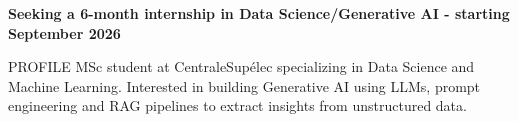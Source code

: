 \documentclass{resume}
\begin{document}
\vspace*{-0.5em}

\vspace*{-0.5em}
\begin{center}
    \noindent\textbf{Seeking a 6-month internship in Data Science/Generative AI - starting September 2026}
\end{center}
\vspace*{-0.5em}
\begin{rSection}{PROFILE}\vspace{-0.3em}
MSc student at CentraleSupélec specializing in Data Science and Machine Learning. Interested in building Generative AI using LLMs, prompt engineering and RAG pipelines to extract insights from unstructured data.
\vspace{-0.3em}
\end{rSection}

\vspace*{-0.5em}
\end{document}
